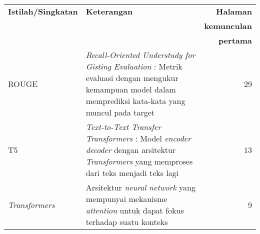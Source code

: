 \begin{center}
   \begin{table}[h]
        \renewcommand{\arraystretch}{1.5}
        \begin{tabularx}{\textwidth}{lXr}
            \textbf{Istilah/Singkatan} & \textbf{Keterangan} & \textbf{Halaman} \\
                                       & & \textbf{kemunculan} \\
                                       & & \textbf{pertama} \\
            ROUGE & \textit{Recall-Oriented Understudy for Gisting Evaluation} : Metrik evaluasi dengan mengukur kemampuan model dalam memprediksi kata-kata yang muncul pada target & 29 \\
            T5 & \textit{Text-to-Text Transfer Transformers} : Model \textit{encoder decoder} dengan arsitektur \textit{Transformers} yang memproses dari teks menjadi teks lagi & 13 \\
            \textit{Transformers} & Arsitektur \textit{neural network} yang mempunyai mekanisme \textit{attention} untuk dapat fokus terhadap suatu konteks & 9 \\
        \end{tabularx}
    \end{table}
\end{center}
